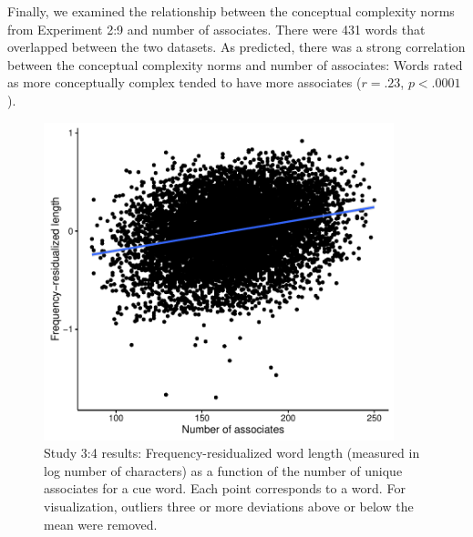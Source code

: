 

Finally, we examined the relationship between the conceptual complexity norms from  Experiment 2:9  and number of associates. There were 431 words that overlapped between the two datasets. As predicted, there was a strong correlation between the conceptual complexity norms and number of associates: Words rated as more conceptually complex tended to have more associates ($r = .23$, $p< .0001$).




  \begin{figure}[t!]
 \begin{center}
  \includegraphics[width=4in]{figs/associate_plot.pdf}
  \caption{\label{fig:associate_plot} Study 3:4 results: Frequency-residualized word length (measured in log number of characters) as a function of the number of unique associates for a cue word. Each point corresponds to a word. For visualization, outliers three or more deviations above or below the mean were removed.}
 \end{center}
\end{figure} 





